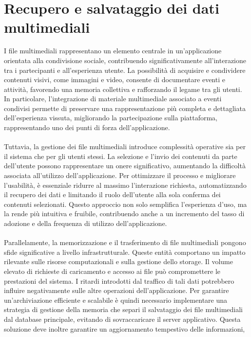 \chapter{Recupero e salvataggio dei dati multimediali}

I file multimediali rappresentano un elemento centrale 
in un'applicazione orientata alla condivisione sociale,
contribuendo significativamente all'interazione tra i partecipanti e all'esperienza utente.
La possibilità di acquisire e condividere contenuti visivi, come immagini e video, 
consente di documentare eventi e attività,
favorendo una memoria collettiva e rafforzando il legame tra gli utenti.
In particolare, l'integrazione di materiale multimediale associato a eventi condivisi 
permette di preservare una rappresentazione più completa e dettagliata dell'esperienza vissuta,
migliorando la partecipazione sulla piattaforma, 
rappresentando uno dei punti di forza dell'applicazione.\\
\\
Tuttavia, la gestione dei file multimediali introduce complessità operative 
sia per il sistema che per gli utenti stessi.
La selezione e l'invio dei contenuti da parte dell'utente
possono rappresentare un onere significativo, 
aumentando la difficoltà associata all'utilizzo dell'applicazione.
Per ottimizzare il processo e migliorare l'usabilità, 
è essenziale ridurre al massimo l'interazione richiesta,
automatizzando il recupero dei dati e limitando il ruolo dell'utente 
alla sola conferma dei contenuti selezionati.
Questo approccio non solo semplifica l'esperienza d'uso, 
ma la rende più intuitiva e fruibile,
contribuendo anche a un incremento del tasso di adozione e
della frequenza di utilizzo dell'applicazione.\\
\\
Parallelamente, la memorizzazione e il trasferimento di file multimediali 
pongono sfide significative a livello infrastrutturale.
Queste entità comportano un impatto rilevante
sulle risorse computazionali e sulla gestione dello storage.
Il volume elevato di richieste di caricamento e accesso ai file 
può compromettere le prestazioni del sistema.
I ritardi introdotti dal traffico di tali dati 
potrebbero influire negativamente sulle altre operazioni dell'applicazione.
Per garantire un'archiviazione efficiente e scalabile 
è quindi necessario implementare una strategia di gestione della memoria
che separi il salvataggio dei file multimediali dal database principale, 
evitando di sovraccaricare il server applicativo.
Questa soluzione deve inoltre garantire un aggiornamento tempestivo delle informazioni, 

